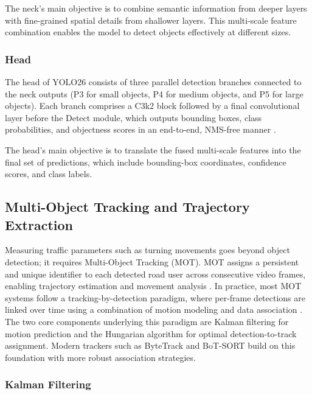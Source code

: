 The neck's main objective is to combine semantic information from deeper layers with fine-grained spatial details from shallower layers. This multi-scale feature combination enables the model to detect objects effectively at different sizes.

\subsubsection*{Head}
The head of YOLO26 consists of three parallel detection branches connected to the neck outputs (P3 for small objects, P4 for medium objects, and P5 for large objects). Each branch comprises a C3k2 block followed by a final convolutional layer before the Detect module, which outputs bounding boxes, class probabilities, and objectness scores in an end-to-end, NMS-free manner \citep{hidayatullah2026yolo26}.

The head's main objective is to translate the fused multi-scale features into the final set of predictions, which include bounding-box coordinates, confidence scores, and class labels.

\subsection{Multi-Object Tracking and Trajectory Extraction}
\label{sec:multi_object_tracking}

Measuring traffic parameters such as turning movements goes beyond object detection; it requires Multi-Object Tracking (MOT). MOT 
assigns a persistent and unique identifier to each detected road user across 
consecutive video frames, enabling trajectory estimation and movement 
analysis \citep{Hassan2024}. In practice, most MOT systems follow a 
tracking-by-detection paradigm, where per-frame detections are linked over 
time using a combination of motion modeling and data association 
\citep{yang2022videoobjecttrackingbased}. The two core components underlying 
this paradigm are Kalman filtering for motion prediction and the Hungarian 
algorithm for optimal detection-to-track assignment. Modern trackers such as 
ByteTrack and BoT-SORT build on this foundation with more robust association 
strategies.

\subsubsection*{Kalman Filtering}


